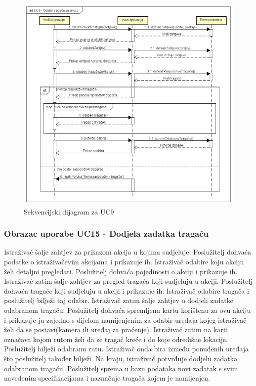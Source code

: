 				\eject
				
				\begin{figure}[H]
					\includegraphics[scale=0.6]{dijagrami/UC9-Odabir tragača za akciju} 
					\centering
					\caption{Sekvencijski dijagram za UC9}
					\label{fig:promjene}
				\end{figure}
				
				\eject
				
				\subsubsection{Obrazac uporabe UC15 - Dodjela zadatka tragaču}
				Istraživač šalje zahtjev za prikazom akcija u kojima sudjeluje. Poslužitelj dohvaća podatke o istraživačevim akcijama i prikazuje ih. Istraživač odabire koju akciju želi detaljni pregledati. Poslužitelj dohvaća pojedinosti o akciji i prikazuje ih. Istraživač zatim šalje zahtjev za pregled tragača koji sudjeluju u akciji. Poslužitelj dohvaća tragače koji sudjeluju u akciji i prikazuje ih. Istraživač odabire tragača i poslužitelj bilježi taj odabir. Istraživač zatim šalje zahtjev o dodjeli zadatke odabranom tragaču. Poslužitelj dohvaća spremljenu kartu korištenu za ovu akciju i prikazuje ju zajedno s dijelom namijenjenim za odabir uređaja kojeg istraživač želi da se postavi(kamera ili uređaj za praćenje). Istraživač zatim na karti označava kojom rutom želi da se tragač kreće i do koje odredišne lokacije. Poslužitelj bilježi odabranu rutu. Istraživač onda bira između ponuđenih uređaja što poslužitelj također bilježi. Na kraju, istraživač potvrđuje dodjelu zadatka odabranom tragaču. Poslužitelj sprema u bazu podataka novi zadatak s svim navedenim specifikacijama i naznačuje tragača kojem je namijenjen. 
				
